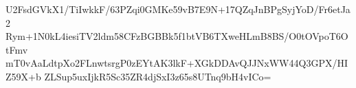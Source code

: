 U2FsdGVkX1/TiIwkkF/63PZqi0GMKe59vB7E9N+17QZqJnBPgSyjYoD/Fr6etJa2
Rym+1N0kL4iesiTV2ldm58CFzBGBBk5f1btVB6TXweHLmB8BS/O0tOVpoT6OtFmv
mT0vAaLdtpXo2FLnwtsrgP0zEYtAK3lkF+XGkDDAvQJJNxWW44Q3GPX/HIZ59X+b
ZLSup5uxIjkR5Sc35ZR4djSxI3z65s8UTnq9bH4vICo=
